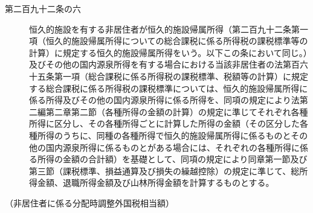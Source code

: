 \documentclass[twocolumn,a4j,10pt]{ltjtarticle}
\begin{document}
\begin{description}
\item[第二百九十二条の六]恒久的施設を有する非居住者が恒久的施設帰属所得（第二百九十二条第一項（恒久的施設帰属所得についての総合課税に係る所得税の課税標準等の計算）に規定する恒久的施設帰属所得をいう。以下この条において同じ。）及びその他の国内源泉所得を有する場合における当該非居住者の法第百六十五条第一項（総合課税に係る所得税の課税標準、税額等の計算）に規定する総合課税に係る所得税の課税標準については、恒久的施設帰属所得に係る所得及びその他の国内源泉所得に係る所得を、同項の規定により法第二編第二章第二節（各種所得の金額の計算）の規定に準じてそれぞれ各種所得に区分し、その各種所得ごとに計算した所得の金額（その区分した各種所得のうちに、同種の各種所得で恒久的施設帰属所得に係るものとその他の国内源泉所得に係るものとがある場合には、それぞれの各種所得に係る所得の金額の合計額）を基礎として、同項の規定により同章第一節及び第三節（課税標準、損益通算及び損失の繰越控除）の規定に準じて、総所得金額、退職所得金額及び山林所得金額を計算するものとする。
\end{description}
\noindent\hspace{10pt}（非居住者に係る分配時調整外国税相当額）
\end{document}
